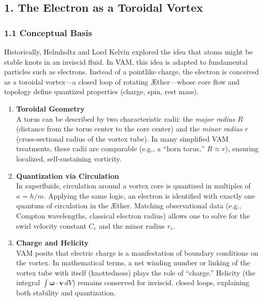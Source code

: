 \subsection*{1. The Electron as a Toroidal Vortex}

\subsubsection*{1.1 Conceptual Basis}
Historically, Helmholtz and Lord Kelvin explored the idea that atoms might be stable knots in an inviscid fluid. In VAM, this idea is adapted to fundamental particles such as electrons. Instead of a pointlike charge, the electron is conceived as a toroidal vortex—a closed loop of rotating Æther—whose core flow and topology define quantized properties (charge, spin, rest mass).

\begin{enumerate}
    \item \textbf{Toroidal Geometry} \\
    A torus can be described by two characteristic radii: the \textit{major radius} \(R\) (distance from the torus center to the core center) and the \textit{minor radius} \(r\) (cross-sectional radius of the vortex tube). In many simplified VAM treatments, these radii are comparable (e.g., a “horn torus,” \(R \approx r\)), ensuring localized, self-sustaining vorticity.

    \item \textbf{Quantization via Circulation} \\
    In superfluids, circulation around a vortex core is quantized in multiples of \(\kappa = h/m\). Applying the same logic, an electron is identified with exactly one quantum of circulation in the Æther. Matching observational data (e.g., Compton wavelengths, classical electron radius) allows one to solve for the swirl velocity constant \(C_e\) and the minor radius \(r_c\).

    \item \textbf{Charge and Helicity} \\
    VAM posits that electric charge is a manifestation of boundary conditions on the vortex. In mathematical terms, a net winding number or linking of the vortex tube with itself (knottedness) plays the role of “charge.” Helicity (the integral \(\int \boldsymbol{\omega}\cdot \mathbf{v}\, dV\)) remains conserved for inviscid, closed loops, explaining both stability and quantization.
\end{enumerate}

